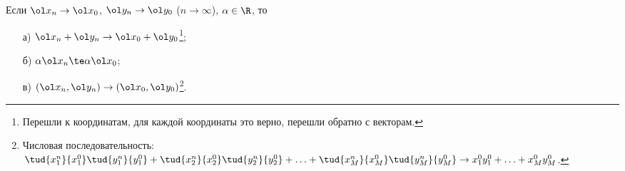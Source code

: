 
	 Если $\ol x_n\to \ol x_0$, $\ol y_n\to \ol y_0$ ($n\to \infty$), $\alpha\in\R$, то 
	 \begin{itemize}
	   \item [а)] $\ol x_n + \ol y_n\to \ol x_0 +\vphantom{\te}\ol y_0$\footnote{Перешли к координатам, для каждой координаты
	   это верно, перешли обратно с векторам.};
	   \item [б)] $\alpha \ol x_n\te\alpha\ol x_0$;
	   \item [в)] $(\ol x_n,\ol y_n)\to (\ol x_0,\ol y_0)$\footnote{Числовая 
	   последовательность: $\tud{x_1^n}{x_1^0}\tud{y_1^n}{y_1^0}+\tud{x_2^n}{x_2^0}\tud{y_2^n}{y_2^0}+\ldots+\tud{x_M^n}{x_M^0}\tud{y_M^n}{y_M^0}\to x_1^0y_1^0 + \ldots + x_M^0y_M^0$.}.
	 \end{itemize}
	 